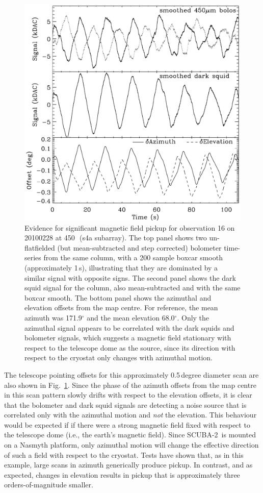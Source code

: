 \documentclass[useAMS,usenatbib,nofootinbib]{mn2e}
\newcommand{\scuba}{SCUBA-2}
\begin{document}
\begin{figure}
\centering
\includegraphics[width=\linewidth]{magpickup.pdf}
\caption{Evidence for significant magnetic field pickup for
  observation 16 on 20100228 at 450\,\micron\ (s4a subarray).  The top
  panel shows two un-flatfielded (but mean-subtracted and step
  corrected) bolometer time-series from the same column, with a 200
  sample boxcar smooth (approximately 1\,s), illustrating that they
  are dominated by a similar signal with opposite signs. The second
  panel shows the dark squid signal for the column, also
  mean-subtracted and with the same boxcar smooth. The bottom panel
  shows the azimuthal and elevation offsets from the map centre. For
  reference, the mean azimuth was 171.9$^\circ$ and the mean elevation
  68.0$^\circ$. Only the azimuthal signal appears to be correlated
  with the dark squids and bolometer signals, which suggests a
  magnetic field stationary with respect to the telescope dome as the
  source, since its direction with respect to the cryostat only
  changes with azimuthal motion.}
\label{fig:magpickup}
\end{figure}

The telescope pointing offsets for this approximately 0.5\,degree
diameter scan are also shown in Fig.~\ref{fig:magpickup}. Since the
phase of the azimuth offsets from the map centre in this scan pattern
slowly drifts with respect to the elevation offsets, it is clear that
the bolometer and dark squid signals are detecting a noise source that
is correlated only with the azimuthal motion and \emph{not} the
elevation. This behaviour would be expected if if there were a strong
magnetic field fixed with respect to the telescope dome (i.e., the
earth's magnetic field). Since \scuba\ is mounted on a Nasmyth
platform, only azimuthal motion will change the effective direction of
such a field with respect to the cryostat. Tests have shown that, as
in this example, large scans in azimuth generically produce pickup. In
contrast, and as expected, changes in elevation results in pickup that
is approximately three orders-of-magnitude smaller.
\end{document}
